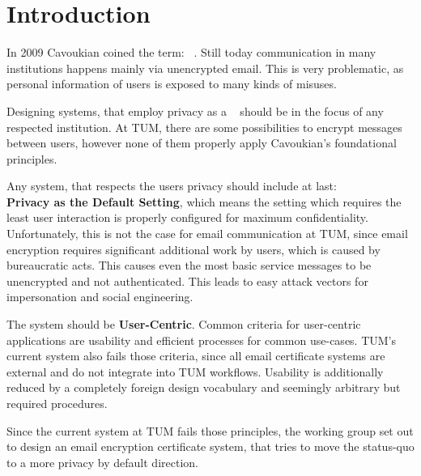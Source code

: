 \chapter{Introduction}\label{ch:introduction}
In 2009 Cavoukian coined the term: ~\cite{cavoukian2009privacy}.
Still today communication in many institutions happens mainly via unencrypted email.
This is very problematic, as personal information of users is exposed to many kinds of misuses.

Designing systems, that employ privacy as a ~\cite{cavoukian2009privacy} should be in the focus of any respected institution.
At TUM, there are some possibilities to encrypt messages between users, however none of them properly apply Cavoukian's
foundational principles.

Any system, that respects the users privacy should include at last:\\
\textbf{Privacy as the Default Setting}, which means the setting which requires the least user interaction is properly
configured for maximum confidentiality.
Unfortunately, this is not the case for email communication at TUM, since email encryption requires significant
additional work by users, which is caused by bureaucratic acts.
This causes even the most basic service messages to be unencrypted and not authenticated.
This leads to easy attack vectors for impersonation and social engineering.

The system should be \textbf{User-Centric}.
Common criteria for user-centric applications are usability and efficient processes for common use-cases.
TUM's current system also fails those criteria, since all email certificate systems are external and do not integrate
into TUM workflows.
Usability is additionally reduced by a completely foreign design vocabulary and seemingly arbitrary but required
procedures.

Since the current system at TUM fails those principles, the working group  set out to design an email
encryption certificate system, that tries to move the status-quo to a more privacy by default direction.

